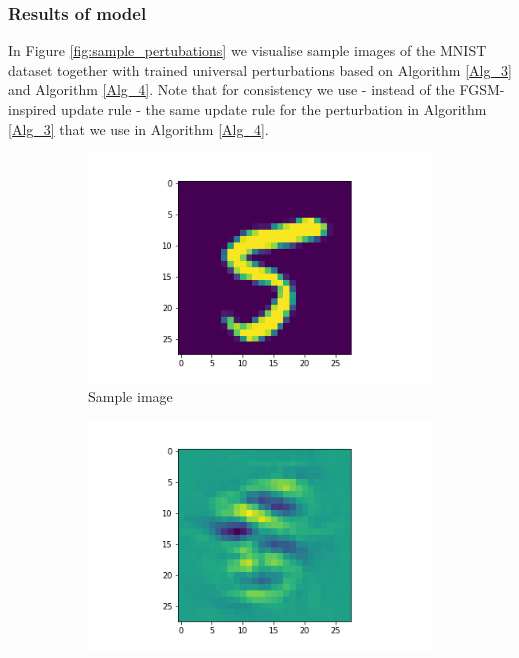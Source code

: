 \subsubsection{Results of model}
In Figure \ref{fig:sample_pertubations} we visualise sample images of the MNIST dataset together with trained universal perturbations based on Algorithm \ref{Alg_3} and Algorithm \ref{Alg_4}. Note that for consistency we use - instead of the FGSM-inspired update rule - the same update rule for the perturbation in Algorithm \ref{Alg_3} that we use in Algorithm \ref{Alg_4}.
\begin{figure}[!h]
    \centering
    \begin{subfigure}[c]{0.3\textwidth}
    \includegraphics[width=\textwidth]{attack_image.png}
    \caption{Sample image}
    \label{subfig:my_label1}
    \end{subfigure}
    \begin{subfigure}[c]{0.3\textwidth}
    \includegraphics[width=\textwidth]{attack_perturbation.png}

\end{subfigure}
\end{figure}
